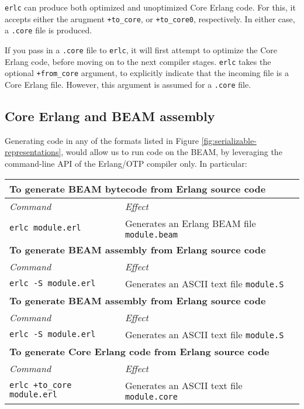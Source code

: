 \texttt{erlc} can produce both optimized and unoptimized Core Erlang
code. For this, it accepts either the arugment \texttt{+to\_core}, or
\texttt{+to\_core0}, respectively. In either case, a \texttt{.core}
file is produced.

If you pass in a \texttt{.core} file to \texttt{erlc}, it will first
attempt to optimize the Core Erlang code, before moving on to the next
compiler stages. \texttt{erlc} takes the optional \texttt{+from\_core}
argument, to explicitly indicate that the incoming file is a Core
Erlang file. However, this argument is assumed for a \texttt{.core}
file.

\subsection{Core Erlang and BEAM assembly}

Generating code in any of the formats listed in Figure
\ref{fig:serializable-representations}, would allow us to run code on
the BEAM, by leveraging the command-line API of the Erlang/OTP
compiler only. In particular:

\begin{table}[h]

\centering

\renewcommand*{\arraystretch}{1.5}

\begin{tabular}{|l|l|}
\hline%
\multicolumn{2}{|l|}{%
  \textbf{To generate BEAM bytecode from Erlang source code}%
}\\\hline%
\emph{Command} & \emph{Effect} \\\hline
  \lstinline[]!erlc module.erl! &%
  Generates an Erlang BEAM file \texttt{module.beam}
\\\hline%
\multicolumn{2}{|l|}{%
  \textbf{To generate BEAM assembly from Erlang source code}%
}\\\hline%
\emph{Command} & \emph{Effect} \\\hline
  \lstinline[]!erlc -S module.erl! &%
  Generates an ASCII text file \texttt{module.S}
\\\hline%
\multicolumn{2}{|l|}{%
  \textbf{To generate BEAM assembly from Erlang source code}%
}\\\hline%
\emph{Command} & \emph{Effect} \\\hline
  \lstinline[]!erlc -S module.erl! &%
  Generates an ASCII text file \texttt{module.S}
\\\hline%
\multicolumn{2}{|l|}{%
  \textbf{To generate Core Erlang code from Erlang source code}%
}\\\hline%
\emph{Command} & \emph{Effect} \\\hline
  \lstinline[]!erlc +to_core module.erl! &%
  Generates an ASCII text file \texttt{module.core}
\\\hline%
\end{tabular}

\end{table}

